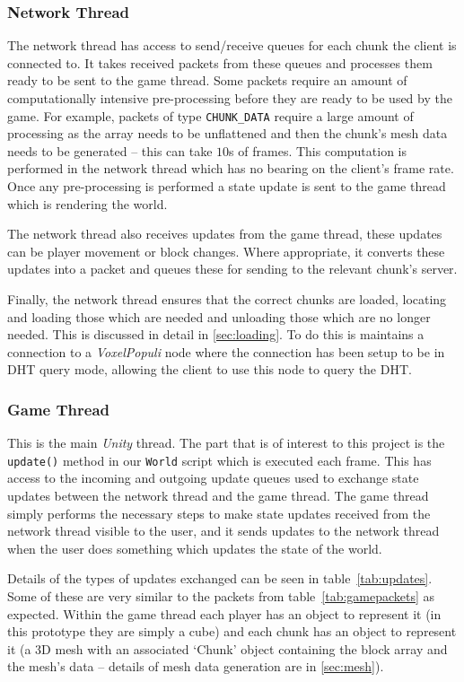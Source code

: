 \documentclass[12pt,notitlepage,a4paper]{report}
\newcommand{\unity}{\emph{Unity}}
\newcommand{\voxpop}{\emph{VoxelPopuli}}
\begin{document}
	\subsubsection{Network Thread}
	\label{sec:nthread}
	The network thread has access to send/receive queues for each chunk the client is connected to. It takes received packets from these queues and processes them ready to be sent to the game thread. Some packets require an amount of computationally intensive pre-processing before they are ready to be used by the game. For example, packets of type \texttt{CHUNK\_DATA} require a large amount of processing as the array needs to be unflattened and then the chunk's mesh data needs to be generated -- this can take $10$s of frames. This computation is performed in the network thread which has no bearing on the client's frame rate. Once any pre-processing is performed a state update is sent to the game thread which is rendering the world.
	
	The network thread also receives updates from the game thread, these updates can be player movement or block changes. Where appropriate, it converts these updates into a packet and queues these for sending to the relevant chunk's server.
	
	Finally, the network thread ensures that the correct chunks are loaded, locating and loading those which are needed and unloading those which are no longer needed. This is discussed in detail in \cref{sec:loading}. To do this is maintains a connection to a \voxpop{} node where the connection has been setup to be in DHT query mode, allowing the client to use this node to query the DHT.
	
	\subsubsection{Game Thread}
	\label{sec:gamethread}
	This is the main \unity{} thread. The part that is of interest to this project is the \texttt{update()} method in our \texttt{World} script which is executed each frame. This has access to the incoming and outgoing update queues used to exchange state updates between the network thread and the game thread. The game thread simply performs the necessary steps to make state updates received from the network thread visible to the user, and it sends updates to the network thread when the user does something which updates the state of the world.
	
	Details of the types of updates exchanged can be seen in table~\ref{tab:updates}. Some of these are very similar to the packets from table~\ref{tab:gamepackets} as expected. Within the game thread each player has an object to represent it (in this prototype they are simply a cube) and each chunk has an object to represent it (a 3D mesh with an associated `Chunk' object containing the block array and the mesh's data -- details of mesh data generation are in \cref{sec:mesh}).
	
\end{document}
